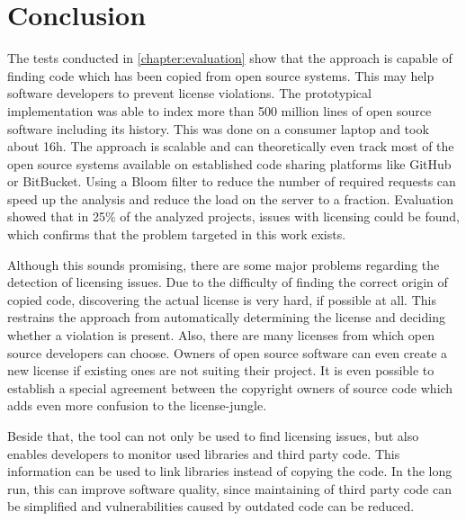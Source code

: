 
\chapter{Conclusion}\label{chapter:conclusion}
The tests conducted in \autoref{chapter:evaluation} show that the approach is capable of finding code which has been copied from open source systems.
This may help software developers to prevent license violations.
The prototypical implementation was able to index more than 500 million lines of open source software including its history.
This was done on a consumer laptop and took about 16h.
The approach is scalable and can theoretically even track most of the open source systems available on established code sharing platforms like GitHub or BitBucket.
Using a Bloom filter to reduce the number of required requests can speed up the analysis and reduce the load on the server to a fraction.
Evaluation showed that in 25\% of the analyzed projects, issues with licensing could be found, which confirms that the problem targeted in this work exists.

Although this sounds promising, there are some major problems regarding the detection of licensing issues.
Due to the difficulty of finding the correct origin of copied code, discovering the actual license is very hard, if possible at all.
This restrains the approach from automatically determining the license and deciding whether a violation is present.
Also, there are many licenses from which open source developers can choose.
Owners of open source software can even create a new license if existing ones are not suiting their project.
It is even possible to establish a special agreement between the copyright owners of source code which adds even more confusion to the license-jungle.

Beside that, the tool can not only be used to find licensing issues, but also enables developers to monitor used libraries and third party code.
This information can be used to link libraries instead of copying the code.
In the long run, this can improve software quality, since maintaining of third party code can be simplified and vulnerabilities caused by outdated code can be reduced.
